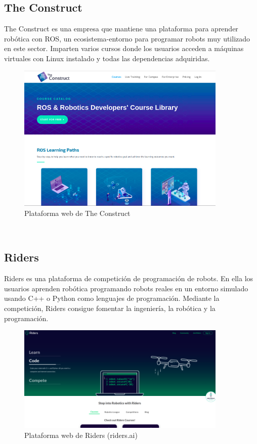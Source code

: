 \cleardoublepage

\subsection{The Construct}
\label{subsec:the_construct}
The Construct es una empresa que mantiene una plataforma para aprender robótica con ROS, un ecosistema-entorno para programar robots muy utilizado en este sector. Imparten varios cursos donde los usuarios acceden a máquinas virtuales con Linux instalado y todas las dependencias adquiridas.\\

\begin{figure}[H]
  \begin{center}
    \includegraphics[width=10cm]{imagenes/cap1/the-construct.png}
  \end{center}
  \caption[Plataforma web de The Construct]{Plataforma web de The Construct\cite{the-construct}}
  \label{fig:the-construct}
\end{figure}\

\subsection{Riders}
\label{subsec:riders}
Riders es una plataforma de competición de programación de robots. En ella los usuarios aprenden robótica programando robots reales en un entorno simulado usando C++ o Python como lenguajes de programación. Mediante la competición, Riders consigue fomentar la ingeniería, la robótica y la programación.\\

\begin{figure}[H]
  \begin{center}
    \includegraphics[width=10cm]{imagenes/cap1/riders.png}
  \end{center}
  \caption[Plataforma web de Riders (riders.ai)]{Plataforma web de Riders (riders.ai) \cite{riders}}
  \label{fig:riders-ai}
\end{figure}\



